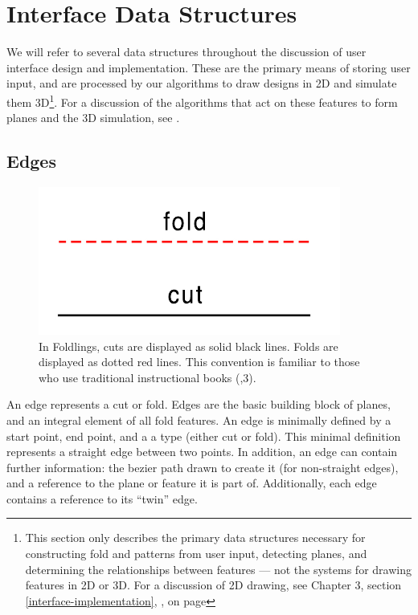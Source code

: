 \section{Interface Data Structures}\label{interface-data-structures}

We will refer to several data structures throughout the discussion of
user interface design and implementation. These are the primary means of
storing user input, and are processed by our algorithms to draw designs
in 2D and simulate them 3D\footnote{This section only describes the
  primary data structures necessary for constructing fold and patterns
  from user input, detecting planes, and determining the relationships
  between features --- not the systems for drawing features in 2D or 3D.
  For a discussion of 2D drawing, see Chapter 3, section
  \ref{interface-implementation}, , on
  page \pageref{interface-implementation}}. For a discussion of the
algorithms that act on these features to form planes and the 3D
simulation, see \citet{mallen}.

\subsection{Edges}\label{edges}

\begin{figure}[htbp]
\centering
\includegraphics{figures/33_UI_Interface_Data_Structures/foldvsedge.pdf}
\caption{In Foldlings, cuts are displayed as solid black lines. Folds
are displayed as dotted red lines. This convention is familiar to those
who use traditional instructional books
(\citet{berenson1972kirigami},3).}
\end{figure}

An edge represents a cut or fold. Edges are the basic building block of
planes, and an integral element of all fold features. An edge is
minimally defined by a start point, end point, and a a type (either cut
or fold). This minimal definition represents a straight edge between two
points. In addition, an edge can contain further information: the bezier
path drawn to create it (for non-straight edges), and a reference to the
plane or feature it is part of. Additionally, each edge contains a
reference to its ``twin'' edge.

